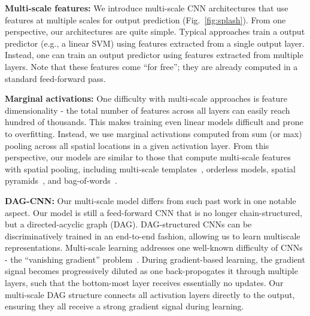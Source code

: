 \documentclass[10pt,twocolumn,letterpaper]{article}
\begin{document}
{\bf Multi-scale features:} We introduce multi-scale CNN architectures that use features at multiple scales for output prediction (Fig.~\ref{fig:splash}). From one perspective, our architectures are quite simple. Typical approaches train a output predictor (e.g., a linear SVM) using features extracted from a single output layer. Instead, one can train an output predictor using features extracted from multiple layers. Note that these features come ``for free''; they are already computed in a standard feed-forward pass. 

{\bf Marginal activations:} One difficulty with multi-scale approaches is feature dimensionality - the total number of features across all layers can easily reach hundred of thousands. This makes training even linear models difficult and prone to overfitting. Instead, we use marginal activations computed from sum (or max) pooling across all spatial locations in a given activation layer. From this perspective, our models are similar to those that compute multi-scale features with spatial pooling, including multi-scale templates~\cite{felzenszwalb2008discriminatively}, orderless models\cite{Gong14}, spatial pyramids~\cite{spatial_pyramid}, and bag-of-words~\cite{sivic2003video}.

{\bf DAG-CNN:} Our multi-scale model differs from such past work in one notable aspect. Our model is still a feed-forward CNN that is no longer chain-structured, but a directed-acyclic graph (DAG). DAG-structured CNNs can be discriminatively trained in an end-to-end fashion, allowing us to learn multiscale representations. Multi-scale learning addresses one well-known difficulty of CNNs - the ``vanishing gradient'' problem~\cite{bengio1994learning}. During gradient-based learning, the gradient signal becomes progressively diluted as one back-propogates it through multiple layers, such that the bottom-most layer receives essentially no updates. Our multi-scale DAG structure connects all activation layers directly to the output, ensuring they all receive a strong gradient signal during learning. 

\end{document}
